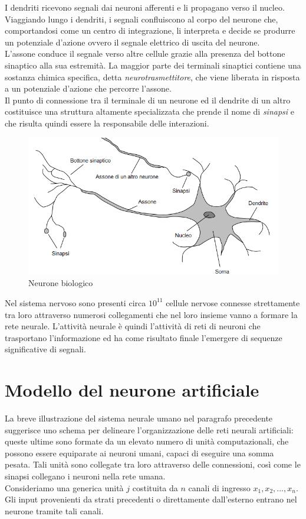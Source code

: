 \documentclass[12pt,a4paper,oneside]{book}
\begin{document}
		I dendriti ricevono segnali dai neuroni afferenti e li propagano verso il nucleo. Viaggiando lungo i dendriti, i segnali confluiscono al corpo del neurone che, comportandosi come un centro di integrazione, li interpreta e decide se produrre un potenziale d'azione ovvero il segnale elettrico di uscita del neurone.\\ 
		L'assone conduce il segnale verso altre cellule grazie alla presenza del bottone sinaptico alla sua estremità.
		La maggior parte dei terminali sinaptici contiene una sostanza chimica specifica, detta \emph{neurotrasmettitore}, che viene liberata in risposta a un potenziale d'azione che percorre l'assone.\\
		Il punto di connessione tra il terminale di un neurone ed il dendrite di un altro costituisce una struttura altamente specializzata che prende il nome di \emph{sinapsi} e che risulta quindi essere la responsabile delle interazioni.\\ 
		 
		  \begin{figure}[h]
		 	\centering
		 	\includegraphics[width=0.7\linewidth]{IMMAGINI/neuron}
		 	\caption{Neurone biologico}
		 	\label{fig:neuron}
		 \end{figure}
		 
	 	 Nel sistema nervoso sono presenti circa $10^{11}$ cellule nervose connesse strettamente tra loro attraverso numerosi collegamenti che nel loro insieme vanno a formare la rete neurale. L'attività neurale è quindi l'attività di reti di neuroni che trasportano l'informazione ed ha come risultato finale l'emergere di sequenze significative di segnali.\\
	 	
	 	
	\section{Modello del neurone artificiale}
		
		La breve illustrazione del sistema neurale umano nel paragrafo precedente suggerisce uno schema per delineare l'organizzazione delle reti neurali artificiali: queste ultime sono formate da un elevato numero di unità computazionali, che possono essere equiparate ai neuroni umani, capaci di eseguire una somma pesata. Tali unità sono collegate tra loro attraverso delle connessioni, così come le sinapsi collegano i neuroni nella rete umana. \\
		Consideriamo una generica unità $j$ costituita da $n$ canali di ingresso $x_{1}, x_{2}, ... ,x_{n}$.
		Gli input provenienti da strati precedenti o direttamente dall'esterno entrano nel neurone tramite tali canali.
\end{document}
